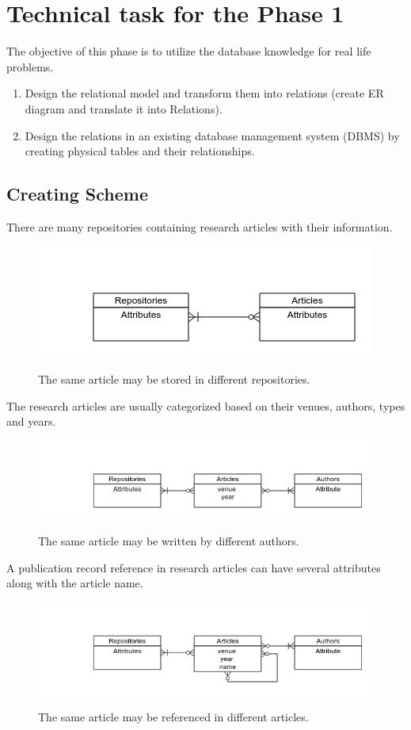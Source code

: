\documentclass[12pt,a4paper]{article}
\begin{document}
\section{Technical task for the Phase 1}
The objective of this phase is to utilize the database knowledge for real life problems.
\begin{enumerate}
\item Design the relational model and transform them into relations (create
ER diagram and translate it into Relations).
\item Design the relations in an existing database management system (DBMS) by creating physical tables and their relationships.
\end{enumerate}
\subsection{Creating Scheme}
There are many repositories containing research articles with their information.
\begin{figure}[h]
\includegraphics[scale=0.7891]{media/phase1/figure1.jpg}\\
\caption{The same article may be stored in different repositories.}
\end{figure}

The research articles are usually categorized based on their venues, authors, types and years.
\begin{figure}[h!]
\includegraphics[scale=0.5791]{media/phase1/figure2.jpg}\\
\caption{The same article may be written by different authors.}
\end{figure}

A publication record reference in research articles can have several attributes along with the article name.\\
\begin{figure}[h!]
\includegraphics[scale=0.5791]{media/phase1/figure3.jpg}\\
\caption{The same article may be referenced in different articles.}
\end{figure}
\end{document}
